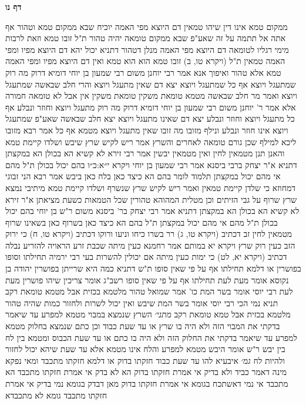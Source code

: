 \documentclass[12pt, openany]{book}
\newcommand{\sethebfont}{
\fontsize{10.5pt}{21.0pt} \selectfont
}
\newcommand{\twocol}[1]{
	{\sethebfont \begin{multicols}{2}
			#1
	\end{multicols}}	
}
\newcommand{\sectname}{}
\newcommand{\newsection}[1]{
	\addcontentsline{toc}{section}{#1}
	\renewcommand{\sectname}{#1}	
	\vspace{-\baselineskip}
	\begin{center}
		\textbf{%
\fontsize{16pt}{16pt}\selectfont
			#1}
	\end{center}
	\vspace{-\baselineskip}
	\nopagebreak
}
\begin{document}
\newsection{דף נו}
\twocol{ממקום טמא אינו דין שיהו טמאין  דם היוצא מפי האמה יוכיח שבא ממקום טמא וטהור אף אתה אל תתמה על זה שאע"פ שבא ממקום טומאה יהיה טהור ת"ל זובו טמא וזאת לרבות מימי רגליו לטומאה 
דם היוצא מפי האמה מנלן דטהור  דתניא  יכול יהא דם היוצא מפיו ומפי האמה טמאין ת"ל (ויקרא טו, ב) זובו טמא הוא הוא טמא  ואין דם היוצא מפיו ומפי האמה טמא אלא טהור 
ואיפוך אנא  אמר רבי יוחנן משום רבי שמעון בן יוחי  דומיא דרוק מה רוק שמתעגל ויוצא אף כל שמתעגל ויוצא יצא דם שאין מתעגל ויוצא 
והרי חלב שבאשה שמתעגל ויוצא ואמר מר  חלב שבאשה מטמא טומאת משקין  טומאת משקין אין אבל לא טומאה חמורה 
אלא אמר ר' יוחנן משום רבי שמעון בן יוחי  דומיא דרוק מה רוק מתעגל ויוצא וחוזר ונבלע אף כל מתעגל ויוצא וחוזר ונבלע יצא דם שאינו מתעגל ויוצא יצא חלב שבאשה שאע"פ שמתעגל ויוצא אינו חוזר ונבלע 
ונילף מזובו  מה זובו שאין מתעגל ויוצא מטמא אף כל  אמר רבא  מזובו ליכא למילף שכן גורם טומאה לאחרים
והשרץ אמר ריש לקיש  שרץ שיבש ושלדו קיימת טמא  והאנן תנן  מטמאין לחין ואין מטמאין יבשין  אמר רבי זירא  לא קשיא הא בכולן הא במקצתן 
דתניא א"ר יצחק ברבי ביסנא אמר רבי שמעון בן יוחי  {ויקרא י״א:כ״ו } בהם יכול בכולן  ת"ל מהם 
אי מהם יכול במקצתן  תלמוד לומר בהם  הא כיצד  כאן בלח כאן ביבש 
אמר רבא  הני זבוגי דמחוזא כי שלדן קיימת טמאין  ואמר ריש לקיש  שרץ שנשרף ושלדו קיימת טמא 
מיתיבי  נמצא שרץ שרוף על גבי הזיתים וכן מטלית המהוהא טהורין שכל הטמאות כשעת מציאתן  א"ר זירא  לא קשיא הא בכולן הא במקצתן 
דתניא אמר רבי יצחק בר' ביסנא משום ר"ש בן יוחי  בהם יכול בכולן  ת"ל מהם 
אי מהם יכול במקצתן  ת"ל בהם  הא כיצד  כאן בשרוף כאן בשאינו שרוף
מטמאין לחין זב דכתיב (ויקרא טו, ג) רר בשרו  כיחו וניעו ורוקו דכתיב (ויקרא טו, ח) כי ירוק הזב כעין רוק 
שרץ {ויקרא יא } במותם אמר רחמנא כעין מיתה  שכבת זרע הראויה להזריע  נבלה דכתיב (ויקרא יא, לט) כי ימות כעין מיתה
אם יכולין להשרות בעי רבי ירמיה  תחילתו וסופו בפושרין או דלמא תחילתו אף על פי שאין סופו 
ת"ש דתניא  כמה היא שרייתן בפושרין  יהודה בן נקוסא אומר  מעת לעת תחילתו אף על פי שאין סופו  רשב"ג אומר  צריכין שיהו פושרין מעת לעת
רבי יוסי אומר בשר המת כו' אמר שמואל  טהור מלטמא בכזית אבל מטמא טומאת רקב  תניא נמי הכי רבי יוסי אומר  בשר המת שיבש ואין יכול לשרות ולחזור כמות שהיה טהור מלטמא בכזית אבל טמא טומאת רקב
{\large\emph{מתני׳}} השרץ שנמצא במבוי מטמא למפרע עד שיאמר בדקתי את המבוי הזה ולא היה בו שרץ או עד שעת כבוד
וכן כתם שנמצא בחלוק מטמא למפרע עד שיאמר בדקתי את החלוק הזה ולא היה בו כתם או עד שעת הכבוס 
ומטמא בין לח בין יבש  ר"ש אומר  היבש מטמא למפרע והלח אינו מטמא אלא עד שעת שיהא יכול לחזור ולהיות לח
{\large\emph{גמ׳}} איבעיא להו עד שעת כבוד חזקתו בדוק או דלמא חזקתו מתכבד 
ומאי נפקא מינה דאמר כביד ולא בדיק  אי אמרת חזקתו בדוק הא לא בדק אי אמרת חזקתו מתכבד הא מתכבד
אי נמי דאשתכח בגומא  אי אמרת חזקתו בדוק מאן דבדק בגומא נמי בדיק אי אמרת חזקתו מתכבד גומא לא מתכבדא
}
\end{document}

